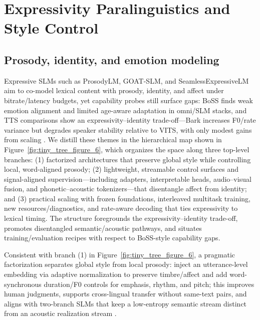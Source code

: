 \documentclass{article}
\begin{document}
\section{Expressivity Paralinguistics and Style Control} \label{sec:expressivityparalinguisticsandstylecontrol}

\subsection{Prosody, identity, and emotion modeling} \label{subsec:prosody,identity,andemotionmodeling}
Expressive SLMs such as ProsodyLM, GOAT-SLM, and SeamlessExpressiveLM aim to co-model lexical content with prosody, identity, and affect under bitrate/latency budgets, yet capability probes still surface gaps: BoSS finds weak emotion alignment and limited age-aware adaptation in omni/SLM stacks, and TTS comparisons show an expressivity--identity trade-off---Bark increases F0/rate variance but degrades speaker stability relative to VITS, with only modest gains from scaling \cite{wang2025bossbeyondsemanticspeech,wang2024evaluatingtextspeechsynthesislargediscre}. We distill these themes in the hierarchical map shown in Figure~\ref{fig:tiny_tree_figure_6}, which organizes the space along three top-level branches: (1) factorized architectures that preserve global style while controlling local, word-aligned prosody; (2) lightweight, streamable control surfaces and signal-aligned supervision---including adapters, interpretable heads, audio--visual fusion, and phonetic--acoustic tokenizers---that disentangle affect from identity; and (3) practical scaling with frozen foundations, interleaved multitask training, new resources/diagnostics, and rate-aware decoding that ties expressivity to lexical timing. The structure foregrounds the expressivity--identity trade-off, promotes disentangled semantic/acoustic pathways, and situates training/evaluation recipes with respect to BoSS-style capability gaps.

Consistent with branch (1) in Figure~\ref{fig:tiny_tree_figure_6}, a pragmatic factorization separates global style from local prosody: inject an utterance-level embedding via adaptive normalization to preserve timbre/affect and add word-synchronous duration/F0 controls for emphasis, rhythm, and pitch; this improves human judgments, supports cross-lingual transfer without same-text pairs, and aligns with two-branch SLMs that keep a low-entropy semantic stream distinct from an acoustic realization stream \cite{huang2023holisticcascadesystembenchmarkhumanevalu}. 
\end{document}
